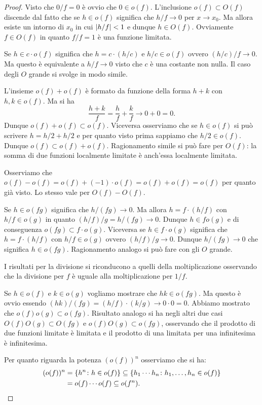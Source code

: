 \begin{proof}
Visto che $0/f = 0$ è ovvio che $0\in o(f)$.
L'inclusione $o(f) \subset O(f)$ discende dal fatto che se $h\in o(f)$ significa che $h/f\to 0$ per $x\to x_0$. Ma allora esiste un intorno di $x_0$ in cui ${\left|h/f\right|}<1$ e dunque $h\in O(f)$. Ovviamente $f\in O(f)$ in quanto $f/f=1$ è una funzione limitata.

Se $h\in c \cdot o(f)$ significa che $h = c \cdot (h/c)$ e $h/c \in o(f)$ ovvero $(h/c)/f \to 0$. Ma questo è equivalente a $h/f\to 0$ visto che $c$ è una costante non nulla. Il caso degli $O$ grande si svolge in modo simile.

L'insieme $o(f)+o(f)$ è formato da funzione della forma $h+k$ con $h,k \in o(f)$. Ma si ha
\[
  \frac{h+k}{f} = \frac{h}{f} + \frac{k}{f} \to 0 + 0 = 0.
\]
Dunque $o(f)+o(f) \subset o(f)$. Viceversa osserviamo che se $h\in o(f)$ si può scrivere $h = h/2 + h/2$ e per quanto visto prima sappiamo che $h/2 \in o(f)$. Dunque $o(f) \subset o(f) + o(f)$.
Ragionamento simile si può fare per $O(f)$: la somma di due funzioni localmente limitate è anch'essa localmente limitata.

Osserviamo che $o(f)-o(f) = o(f) + (-1)\cdot o(f) = o(f) + o(f) = o(f)$
per quanto già visto. Lo stesso vale per $O(f)-O(f)$.

Se $h\in o(fg)$ significa che $h/(fg)\to 0$. Ma allora $h = f\cdot (h/f)$ con $h/f \in o(g)$ in quanto $(h/f)/g = h/(fg)\to 0$. Dunque $h \in fo(g)$ e di conseguenza $o(fg)\subset f \cdot o(g)$. Viceversa se $h \in f\cdot o(g)$ significa che $h = f \cdot(h/f)$ con $h/f \in o(g)$ ovvero $(h/f)/g \to 0$. Dunque $h/(fg) \to 0$ che significa $h\in o(fg)$.
Ragionamento analogo si può fare con gli $O$ grande.

I risultati per la divisione si riconducono a quelli della moltiplicazione osservando che la divisione per $f$ è uguale alla moltiplicazione per $1/f$.

Se $h\in o(f)$ e $k\in o(g)$ vogliamo mostrare che $hk\in o(fg)$.
Ma questo è ovvio essendo $(hk)/(fg) = (h/f)\cdot(k/g) \to 0\cdot 0 = 0$. Abbiamo mostrato che $o(f)o(g)\subset o(fg)$. Risultato analogo si ha negli altri due casi $O(f)O(g)\subset O(fg)$ e $o(f)O(g)\subset o(fg)$, osservando che il prodotto di due funzioni limitate è limitata e il prodotto di una limitata per una infinitesima è infinitesima.

Per quanto riguarda la potenza $(o(f))^n$ osserviamo che si ha:
\begin{align*}
  (o(f))^n &= {\left\{ h^n \colon h\in o(f) \right\}}
      \subseteq {\left\{ h_1 \cdots h_n \colon h_1, \dots, h_n \in o(f) \right\}}\\
      &= o(f) \cdots o(f) \subseteq o(f^n).
\end{align*}


\end{proof}
